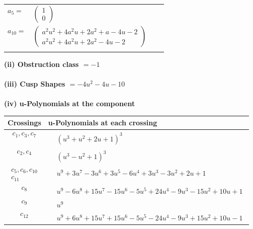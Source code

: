 \documentclass[1p]{elsarticle_modified}
\theoremstyle{definition}
\begin{document}
\begin{tabular}{m{7pt} m{180pt} m{7pt} m{180pt} }
\flushright $a_{5}=$&$\begin{pmatrix}1\\0\end{pmatrix}$ \\
\flushright $a_{10}=$&$\begin{pmatrix}a^2 u^2+4 a^2 u+2 a^2+a-4 u-2\\a^2 u^2+4 a^2 u+2 a^2-4 u-2\end{pmatrix}$\\&\end{tabular}
\flushleft \textbf{(ii) Obstruction class $= -1$}\\~\\
\flushleft \textbf{(iii) Cusp Shapes $= -4 u^2-4 u-10$}\\~\\
\newpage\renewcommand{\arraystretch}{1}
\flushleft \textbf{(iv) u-Polynomials at the component}\newline \\
\begin{tabular}{m{50pt}|m{274pt}}
Crossings & \hspace{64pt}u-Polynomials at each crossing \\
\hline $$\begin{aligned}c_{1},c_{3},c_{7}\end{aligned}$$&$\begin{aligned}
&(u^3+u^2+2 u+1)^3
\end{aligned}$\\
\hline $$\begin{aligned}c_{2},c_{4}\end{aligned}$$&$\begin{aligned}
&(u^3- u^2+1)^3
\end{aligned}$\\
\hline $$\begin{aligned}c_{5},c_{6},c_{10}\\c_{11}\end{aligned}$$&$\begin{aligned}
&u^9+3 u^7-3 u^6+3 u^5-6 u^4+3 u^3-3 u^2+2 u+1
\end{aligned}$\\
\hline $$\begin{aligned}c_{8}\end{aligned}$$&$\begin{aligned}
&u^9-6 u^8+15 u^7-15 u^6-5 u^5+24 u^4-9 u^3-15 u^2+10 u+1
\end{aligned}$\\
\hline $$\begin{aligned}c_{9}\end{aligned}$$&$\begin{aligned}
&u^9
\end{aligned}$\\
\hline $$\begin{aligned}c_{12}\end{aligned}$$&$\begin{aligned}
&u^9+6 u^8+15 u^7+15 u^6-5 u^5-24 u^4-9 u^3+15 u^2+10 u-1
\end{aligned}$\\
\hline
\end{tabular}\\~\\
\end{document}
